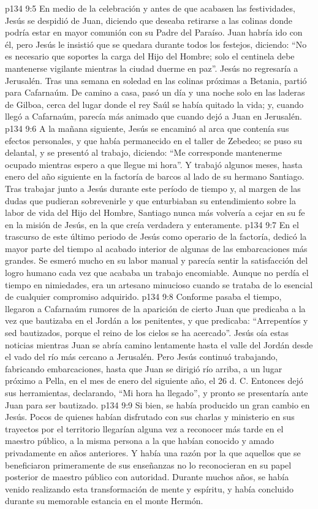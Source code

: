 \vs p134 9:5 En medio de la celebración y antes de que acabasen las festividades, Jesús se despidió de Juan, diciendo que deseaba retirarse a las colinas donde podría estar en mayor comunión con su Padre del Paraíso. Juan habría ido con él, pero Jesús le insistió que se quedara durante todos los festejos, diciendo: “No es necesario que soportes la carga del Hijo del Hombre; solo el centinela debe mantenerse vigilante mientras la ciudad duerme en paz”. Jesús no regresaría a Jerusalén. Tras una semana en soledad en las colinas próximas a Betania, partió para Cafarnaúm. De camino a casa, pasó un día y una noche solo en las laderas de Gilboa, cerca del lugar donde el rey Saúl se había quitado la vida; y, cuando llegó a Cafarnaúm, parecía más animado que cuando dejó a Juan en Jerusalén.
\vs p134 9:6 A la mañana siguiente, Jesús se encaminó al arca que contenía sus efectos personales, y que había permanecido en el taller de Zebedeo; se puso su delantal, y se presentó al trabajo, diciendo: “Me corresponde mantenerme ocupado mientras espero a que llegue mi hora”. Y trabajó algunos meses, hasta enero del año siguiente en la factoría de barcos al lado de su hermano Santiago. Tras trabajar junto a Jesús durante este período de tiempo y, al margen de las dudas que pudieran sobrevenirle y que enturbiaban su entendimiento sobre la labor de vida del Hijo del Hombre, Santiago nunca más volvería a cejar en su fe en la misión de Jesús, en la que creía verdadera y enteramente.
\vs p134 9:7 En el trascurso de este último periodo de Jesús como operario de la factoría, dedicó la mayor parte del tiempo al acabado interior de algunas de las embarcaciones más grandes. Se esmeró mucho en su labor manual y parecía sentir la satisfacción del logro humano cada vez que acababa un trabajo encomiable. Aunque no perdía el tiempo en nimiedades, era un artesano minucioso cuando se trataba de lo esencial de cualquier compromiso adquirido.
\vs p134 9:8 \pc Conforme pasaba el tiempo, llegaron a Cafarnaúm rumores de la aparición de cierto Juan que predicaba a la vez que bautizaba en el Jordán a los penitentes, y que predicaba: “Arrepentíos y sed bautizados, porque el reino de los cielos se ha acercado”. Jesús oía estas noticias mientras Juan se abría camino lentamente hasta el valle del Jordán desde el vado del río más cercano a Jerusalén. Pero Jesús continuó trabajando, fabricando embarcaciones, hasta que Juan se dirigió río arriba, a un lugar próximo a Pella, en el mes de enero del siguiente año, el 26 d. C. Entonces dejó sus herramientas, declarando, “Mi hora ha llegado”, y pronto se presentaría ante Juan para ser bautizado.
\vs p134 9:9 Si bien, se había producido un gran cambio en Jesús. Pocos de quienes habían disfrutado con sus charlas y ministerio en sus trayectos por el territorio llegarían alguna vez a reconocer más tarde en el maestro público, a la misma persona a la que habían conocido y amado privadamente en años anteriores. Y había una razón por la que aquellos que se beneficiaron primeramente de sus enseñanzas no lo reconocieran en su papel posterior de maestro público con autoridad. Durante muchos años, se había venido realizando esta transformación de mente y espíritu, y había concluido durante su memorable estancia en el monte Hermón.
